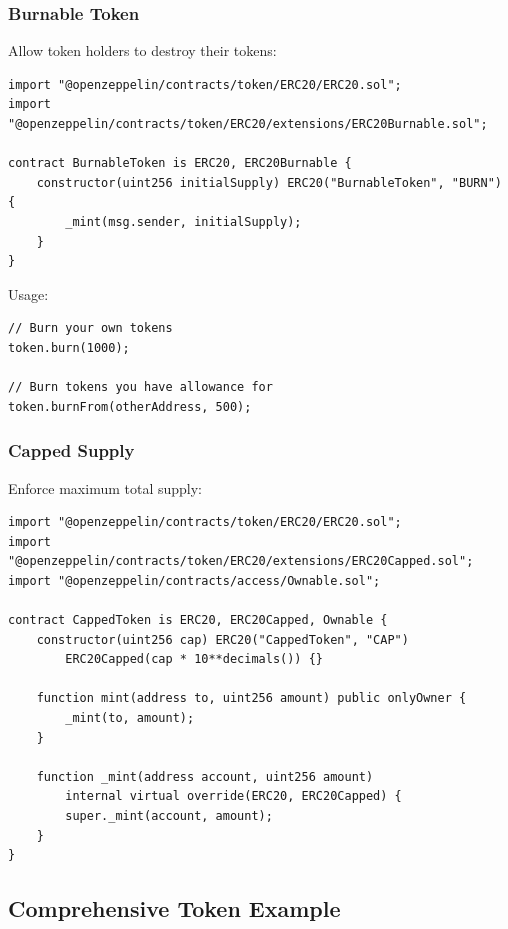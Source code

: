 \documentclass[11pt,a4paper]{article}
\begin{document}
\subsubsection{Burnable Token}

Allow token holders to destroy their tokens:

\begin{lstlisting}[language=Solidity]
import "@openzeppelin/contracts/token/ERC20/ERC20.sol";
import "@openzeppelin/contracts/token/ERC20/extensions/ERC20Burnable.sol";

contract BurnableToken is ERC20, ERC20Burnable {
    constructor(uint256 initialSupply) ERC20("BurnableToken", "BURN") {
        _mint(msg.sender, initialSupply);
    }
}
\end{lstlisting}

Usage:
\begin{lstlisting}[language=Solidity]
// Burn your own tokens
token.burn(1000);

// Burn tokens you have allowance for
token.burnFrom(otherAddress, 500);
\end{lstlisting}

\subsubsection{Capped Supply}

Enforce maximum total supply:

\begin{lstlisting}[language=Solidity]
import "@openzeppelin/contracts/token/ERC20/ERC20.sol";
import "@openzeppelin/contracts/token/ERC20/extensions/ERC20Capped.sol";
import "@openzeppelin/contracts/access/Ownable.sol";

contract CappedToken is ERC20, ERC20Capped, Ownable {
    constructor(uint256 cap) ERC20("CappedToken", "CAP")
        ERC20Capped(cap * 10**decimals()) {}

    function mint(address to, uint256 amount) public onlyOwner {
        _mint(to, amount);
    }

    function _mint(address account, uint256 amount)
        internal virtual override(ERC20, ERC20Capped) {
        super._mint(account, amount);
    }
}
\end{lstlisting}

\subsection{Comprehensive Token Example}
\end{document}
